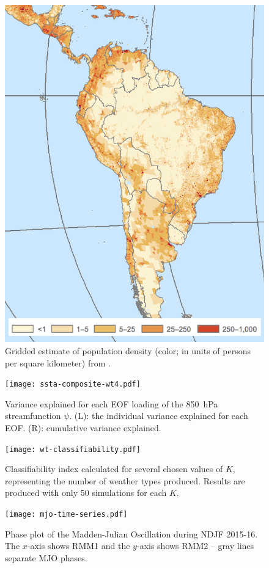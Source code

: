 \documentclass{article}
\begin{document}
\begin{figure}
	\centering
  \includegraphics[width=\textwidth,height=0.6\textheight,keepaspectratio=true]{gpw-v4-2015.png}
	\caption{
		Gridded estimate of population density (color; in units of persons per square kilometer) from \citet{GPWv4}.
	}
\end{figure}

\begin{figure}
  \texttt{[image: ssta-composite-wt4.pdf]}
	\caption{
		Variance explained for each EOF loading of the \SI{850}{\hecto\pascal} streamfunction $\psi$.
    (L): the individual variance explained for each EOF.
		(R): cumulative variance explained.
	}
\end{figure}

\begin{figure}
  \texttt{[image: wt-classifiability.pdf]}
	\caption{
		Classifiability index \citep[see Methods and][]{Michelangeli1995} calculated for several chosen values of $K$, representing the number of weather types produced.
		Results are produced with only 50 simulations for each $K$.
	}
\end{figure}

\begin{figure}
  \texttt{[image: mjo-time-series.pdf]}
	\caption{
		Phase plot of the Madden-Julian Oscillation during NDJF 2015-16.
		The $x$-axis shows RMM1 and the $y$-axis shows RMM2 -- gray lines separate MJO phases.
	}
	\label{fig:mjo-ts}
\end{figure}

\clearpage


\end{document}

